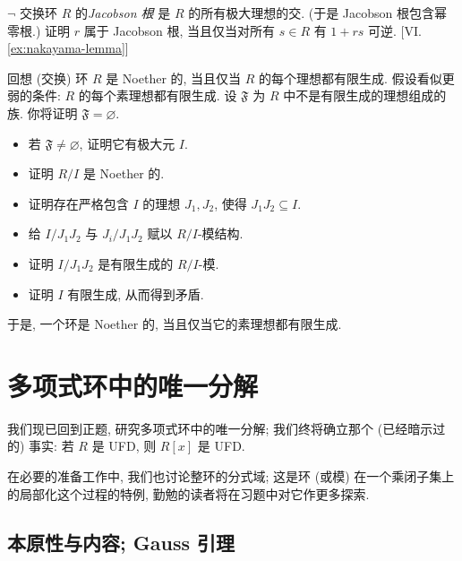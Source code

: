 \begin{prob}
\label{ex:jacobson-radical}
$\neg$ 交换环 $R$ 的\emph{Jacobson 根} 是 $R$ 的所有极大理想的交. (于是 Jacobson 根包含幂零根.) 证明 $r$ 属于 Jacobson 根, 当且仅当对所有 $s\in R$ 有 $1+rs$ 可逆. [VI.\ref{ex:nakayama-lemma}]
\end{prob}

\begin{prob}
\label{ex:cohen-noetherian}
回想 (交换) 环 $R$ 是 Noether 的, 当且仅当 $R$ 的每个理想都有限生成. 假设看似更弱的条件: $R$ 的每个素理想都有限生成. 设 $\mathfrak{F}$ 为 $R$ 中不是有限生成的理想组成的族. 你将证明 $\mathfrak{F}=\varnothing$.
\begin{itemize}
\item 若 $\mathfrak{F}\neq\varnothing$, 证明它有极大元 $I$.
\item 证明 $R/I$ 是 Noether 的.
\item 证明存在严格包含 $I$ 的理想 $J_1,J_2$, 使得 $J_1J_2\subseteq I$.
\item 给 $I/J_1J_2$ 与 $J_i/J_1J_2$ 赋以 $R/I$-模结构.
\item 证明 $I/J_1J_2$ 是有限生成的 $R/I$-模.
\item 证明 $I$ 有限生成, 从而得到矛盾.
\end{itemize}
于是, 一个环是 Noether 的, 当且仅当它的素理想都有限生成.
\end{prob}
\section{多项式环中的唯一分解}
\label{sec:ufd-poly-rings}

\noindent 我们现已回到正题, 研究多项式环中的唯一分解; 我们终将确立那个 (已经暗示过的) 事实: 若 $R$ 是 UFD, 则 $R[x]$ 是 UFD.

\noindent 在必要的准备工作中, 我们也讨论整环的分式域; 这是环 (或模) 在一个乘闭子集上的局部化这个过程的特例, 勤勉的读者将在习题中对它作更多探索.

\subsection{本原性与内容; Gauss 引理}
\label{subsec:primitivity-content}

